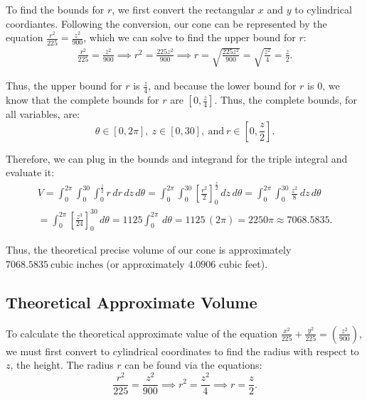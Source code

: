 \documentclass[12pt]{article}
\begin{document}
To find the bounds for $r$, we first convert the rectangular $x$ and $y$ to
cylindrical coordiantes. Following the conversion, our cone can be represented
by the equation $\frac{r^{2}}{225} = \frac{z^{2}}{900}$, which we can solve to
find the upper bound for $r$:
\begin{align*}
    \frac{r^{2}}{225} = \frac{z^{2}}{900} \implies r^{2} = \frac{225z^{2}}{900} \implies r = 
    \sqrt{ \frac{225z^{2}}{900} } = \sqrt{ \frac{z^{2}}{4} } = \frac{z}{2}.
\end{align*}

Thus, the upper bound for $r$ is $\frac{z}{4}$, and because the lower  
bound for $r$ is $0$, we know that the complete bounds for $r$ are $[0,
\frac{z}{4}]$. Thus, the complete bounds, for all variables, are:
\begin{equation*}
    \theta \in \left[ 0, 2\pi \right], \ z \in \left[ 0, 30 \right],  \ \text{and} 
    \ r \in \left[ 0, \frac{z}{2} \right].
\end{equation*}

Therefore, we can plug in the bounds and integrand for the triple integral and
evaluate it:
\begin{gather*}
    V = \int_{0}^{2\pi} \int_{0}^{30} \int_{0}^{\frac{z}{2}} r \, dr  \, dz  \, d\theta
    = \int_{0}^{2\pi} \int_{0}^{30} \left[ \frac{r^{2}}{2} \right]_{0}^{\frac{z}{2}} \, dz  \, d\theta
    = \int_{0}^{2\pi} \int_{0}^{30} \frac{z^{2}}{8} \, dz  \, d\theta \\
    = \int_{0}^{2\pi} \left[ \frac{z^{3}}{24} \right]_{0}^{30} \, d\theta
    = 1125 \int_{0}^{2\pi} \, d\theta
    = 1125 \, (2\pi)
    = 2250\pi
    \approx 7068.5835.
\end{gather*}

Thus, the theoretical precise volume of our cone is approximately $\boxed{
7068.5835 \ \text{cubic inches}}$ (or approximately $4.0906$ cubic feet).

\subsection{Theoretical Approximate Volume}

To calculate the theoretical approximate value of the equation
$\frac{x^{2}}{225} + \frac{y^{2}}{225} = (\frac{z^{2}}{900})$, we must first
convert to cylindrical coordinates to find the radius with respect to $z$, the
height. The radius $r$ can be found via the equations:
\begin{equation*}
    \frac{r^{2}}{225} = \frac{z^{2}}{900} \implies r^{2} = \frac{z^{2}}{4} \implies r = \frac{z}{2}.
\end{equation*}
\end{document}
